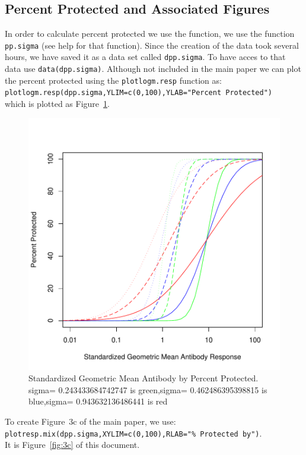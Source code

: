 \documentclass{article}[12pt]
\begin{document}
\subsection{Percent Protected and Associated Figures}

In order to calculate percent protected we use the function, we use the function \texttt{pp.sigma} 
(see help for that function). 
Since the creation of the data took several hours, we have saved it as a data set called \texttt{dpp.sigma}.
To have acces to that data use \texttt{data(dpp.sigma)}. 
Although not included in the main paper we can plot the percent protected using the \texttt{plotlogm.resp} 
function as: \\
 \texttt{plotlogm.resp(dpp.sigma,YLIM=c(0,100),YLAB="Percent Protected")} \\
 which is 
plotted as Figure~\ref{fig:logmean.pp.sigma}.

\begin{figure}
\caption{Standardized Geometric Mean Antibody by Percent Protected.
sigma= 0.243433684742747  is  green,sigma= 0.462486395398815  is  blue,sigma= 0.943632136486441  is  red
 \label{fig:logmean.pp.sigma} }
\includegraphics{hbimdetails-figppsigma}
\end{figure}



To create Figure~3c of the main paper, 
we use: \\  
 \texttt{plotresp.mix(dpp.sigma,XYLIM=c(0,100),RLAB="\% Protected by")}. \\
 It is Figure~\ref{fig:3c} of this document.
\end{document}
